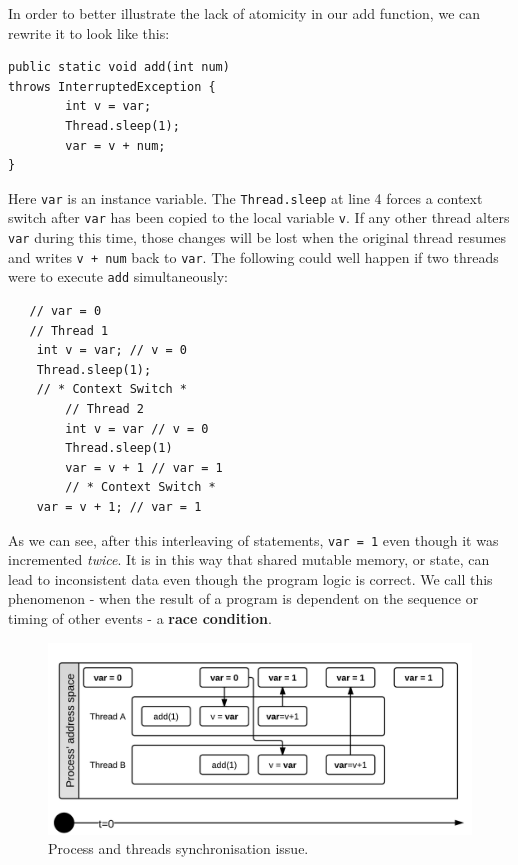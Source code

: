 \documentclass[a4paper,12pt]{kth-mag}
\begin{document}
In order to better illustrate the lack of atomicity in our add function, we can rewrite it to look like this:

\begin{listing}[H]
	\begin{verbatim}
public static void add(int num) 
throws InterruptedException {
        int v = var;
        Thread.sleep(1);
        var = v + num;
}
  	\end{verbatim}
\end{listing}

Here \texttt{var} is an instance variable. The \texttt{Thread.sleep} at line 4 forces a context switch after \texttt{var} has been copied to the local variable \texttt{v}. If any other thread alters \texttt{var} during this time, those changes will be lost when the original thread resumes and writes \texttt{v + num} back to \texttt{var}. The following could well happen if two threads were to execute \texttt{add} simultaneously:

\begin{listing}[H]
	\begin{verbatim}
   // var = 0
   // Thread 1
    int v = var; // v = 0
    Thread.sleep(1);
    // * Context Switch *
        // Thread 2
        int v = var // v = 0
        Thread.sleep(1)
        var = v + 1 // var = 1
        // * Context Switch *
    var = v + 1; // var = 1
  	\end{verbatim}
\end{listing}

As we can see, after this interleaving of statements, \texttt{var = 1} even though it was incremented \textit{twice}. It is in this way that shared mutable memory, or state, can lead to inconsistent data even though the program logic is correct. We call this phenomenon - when the result of a program is dependent on the sequence or timing of other events - a \textbf{race condition}.

\begin{figure}[H]
\begin{center}
    \includegraphics{images/ProcessAndThreads.png}
\caption{Process and threads synchronisation issue.}\label{fig:pat_sync_issue}
\end{center}
\end{figure}
\end{document}
